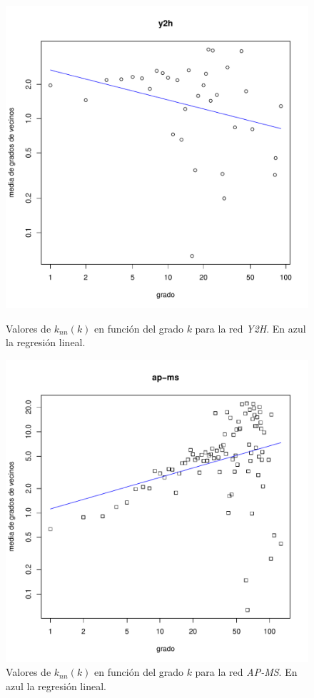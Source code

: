 \documentclass{article}
\begin{document}
\begin{figure}[!htb]
\centering
   \begin{minipage}{0.3\textwidth}
	\centering
	\includegraphics[width=.7\linewidth]{Imagenes_P4/ej46}
	\caption{Valores de $k_{nn}(k)$ en función del grado $k$ para la red \textit{Y2H}. En azul la regresión lineal.}
	\label{pt4y2h}
   \end{minipage}
   \hspace{6px}
   \begin{minipage}{0.3\textwidth}
	\centering
	\includegraphics[width=.7\linewidth]{Imagenes_P4/ej48}
	\caption{Valores de $k_{nn}(k)$ en función del grado $k$ para la red \textit{AP-MS}. En azul la regresión lineal.}
	\label{pt4apms}
   \end{minipage}
\end{figure}





\end{document}
